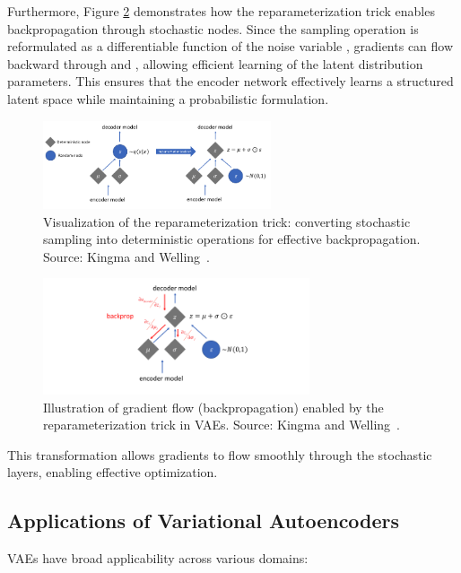 Furthermore, Figure \ref{fig:reparameterization_backprop} demonstrates how the reparameterization trick enables backpropagation through stochastic nodes. Since the sampling operation is reformulated as a differentiable function of the noise variable , gradients can flow backward through  and , allowing efficient learning of the latent distribution parameters. This ensures that the encoder network effectively learns a structured latent space while maintaining a probabilistic formulation.

\begin{figure}[htbp]
    \centering
    \includegraphics[width=0.6\textwidth]{img/vae/reparameterization_trick.png}
    \caption[Reparameterization trick visualization]{Visualization of the reparameterization trick: converting stochastic sampling into deterministic operations for effective backpropagation. Source: Kingma and Welling~\cite{Kingma_2019}.}
    \label{fig:reparameterization_trick}
\end{figure}

\begin{figure}[htbp]
    \centering
    \includegraphics[width=0.7\textwidth]{img/vae/reparameterization_backprop.png}
    \caption[Backpropagation flow via reparameterization trick]{Illustration of gradient flow (backpropagation) enabled by the reparameterization trick in VAEs. Source: Kingma and Welling~\cite{Kingma_2019}.}
    \label{fig:reparameterization_backprop}
\end{figure}


This transformation allows gradients to flow smoothly through the stochastic layers, enabling effective optimization.






\subsection{Applications of Variational Autoencoders}
VAEs have broad applicability across various domains:

